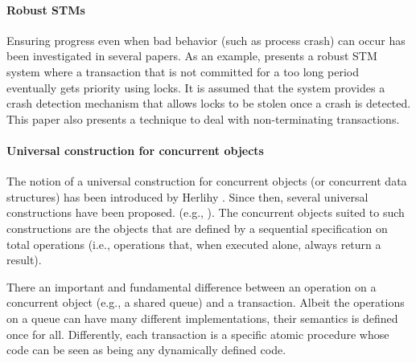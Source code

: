\paragraph{Robust STMs} 
Ensuring progress even when bad behavior (such as process crash) can occur 
has been investigated in several papers. As an example,  \cite{WRFF10} 
presents a robust STM system where a transaction that is not committed 
for a too long period eventually gets  priority using locks. It is assumed 
that  the system   provides a   crash detection  mechanism that  allows 
locks to be stolen once a  crash  is detected. This paper also presents a
technique to deal with  non-terminating transactions. 



\paragraph{Universal construction for concurrent objects}
The notion of a universal construction for concurrent objects (or 
concurrent data  structures) has been introduced by Herlihy \cite{H91}.
Since then, several  universal constructions have been proposed. 
(e.g., \cite{ADT95,AM99,FK09}).  
The concurrent objects suited to such   constructions are 
the objects that are  defined by a sequential specification
on total operations (i.e., operations that, when executed alone, 
always return a result). 



There an important and fundamental difference
 between an operation on a concurrent 
object (e.g., a shared queue) and a transaction. 
Albeit the operations on a queue can have many different implementations, 
their semantics is  defined once for all. 
Differently, each transaction is a specific  atomic procedure whose 
code can be  seen as being any dynamically  defined code.







